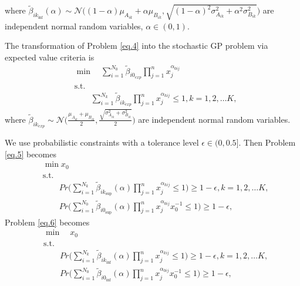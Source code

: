 \begin{description}
where ${\tilde{\beta}}_{{ik}_{\inf}}(\alpha)\sim \mathcal{N}\big((1-\alpha)\mu_{A_{ik}}+\alpha\mu_{B_{ik}},\sqrt{(1-\alpha)^2\sigma_{A_{ik}}^2+\alpha^2\sigma_{B_{ik}}^2}\big)$ are independent normal random variables, $\alpha\in (0,1)$.
\item[III.] The transformation of Problem \ref{eq.4} into the stochastic GP problem via expected value criteria is 
\begin{equation}\label{eq.7}
	\begin{aligned}
		&	\min \quad \sum\limits_{i=1}^{N_0}{\tilde{\beta}}_{{i0}_{exp}}\prod\limits_{j=1}^{n}x_j^{\alpha_{0ij}}\\
		&	\text{s.t.}\\
		& \qquad \sum\limits_{i=1}^{N_k}{\tilde{\beta}}_{{ik}_{exp}}\prod\limits_{j=1}^{n}x_j^{\alpha_{kij}}\leq 1,k=1,2,\ldots K,
	\end{aligned}
\end{equation}
where ${\tilde{\beta}}_{{ik}_{exp}}\sim \mathcal{N}\bigg(\frac{\mu_{A_{ik}}+\mu_{B_{ik}}}{2},\frac{\sqrt{\sigma_{A_{ik}}^2+\sigma_{B_{ik}}^2}}{2}\bigg)$ are independent normal random variables.
\end{description}
We use probabilistic constraints with a tolerance level $\epsilon \in (0,0.5].$ Then Problem \ref{eq.5} becomes 
\begin{equation}\label{eq.8}
	\begin{aligned}
		&	\min x_0 \\
		&	\text{s.t.}\\
		& \qquad Pr\bigg(\sum\limits_{i=1}^{N_k}{\tilde{\beta}}_{{ik}_{\sup}}(\alpha)\prod\limits_{j=1}^{n}x_j^{\alpha_{kij}}\leq 1\bigg)\ge 1-\epsilon,k=1,2,\ldots K,\\
		& \qquad Pr\bigg(\sum\limits_{i=1}^{N_0}{\tilde{\beta}}_{{i0}_{\sup}}(\alpha)\prod\limits_{j=1}^{n}x_j^{\alpha_{0ij}}x_0^{-1}\le1\bigg)\ge 1-\epsilon,
	\end{aligned}
\end{equation}
Problem \ref{eq.6} becomes
\begin{equation}\label{eq.9}
	\begin{aligned}
		&	\min \quad x_0\\ 
		&	\text{s.t.}\\
		& \qquad Pr\bigg(\sum\limits_{i=1}^{N_k}{\tilde{\beta}}_{{ik}_{\inf}}(\alpha)\prod\limits_{j=1}^{n}x_j^{\alpha_{kij}}\leq 1\bigg)\ge1-\epsilon,k=1,2,\ldots K,\\
		& \qquad Pr\bigg(\sum\limits_{i=1}^{N_0}{\tilde{\beta}}_{{i0}_{\inf}}(\alpha)\prod\limits_{j=1}^{n}x_j^{\alpha_{0ij}}x_0^{-1}\le1\bigg)\ge 1-\epsilon,
	\end{aligned}
\end{equation}
